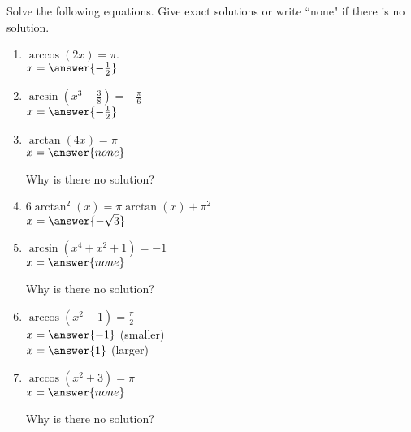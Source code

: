 \documentclass{ximera}
\author{Elizabeth Campolongo}
\begin{document}
\begin{exercise}
Solve the following equations. Give exact solutions or write ``none" if there is no solution. 
%
\begin{enumerate}

\item $\arccos(2x) = \pi.$\\
$x = \answer{-\frac{1}{2}}$

\item $\arcsin(x^3 - \frac{3}{8}) = -\frac{\pi}{6}$\\
$x = \answer{-\frac{1}{2}}$

\item $\arctan(4x) = \pi$\\
$x = \answer{none}$
\begin{exercise}
Why is there no solution?
\begin{multipleChoice}
\end{multipleChoice}
\end{exercise}

\item $6\arctan^2(x)=\pi \arctan(x) + \pi^2$\\
$x = \answer{-\sqrt{3}}$

\item $\arcsin(x^4+x^2+1) = -1$ \\
$x = \answer{none}$
\begin{exercise}
Why is there no solution?
\begin{multipleChoice}
\end{multipleChoice}
\end{exercise}

\item $\arccos(x^2-1) = \frac{\pi}{2}$ \\
$x = \answer{-1}$ (smaller)\\
$x = \answer{1}$ (larger)

\item $\arccos(x^2+3) = \pi$ \\
$x = \answer{none}$
\begin{exercise}
Why is there no solution?
\begin{multipleChoice}
\end{multipleChoice}
\end{exercise}

\end{enumerate}

\end{exercise}
\end{document}
